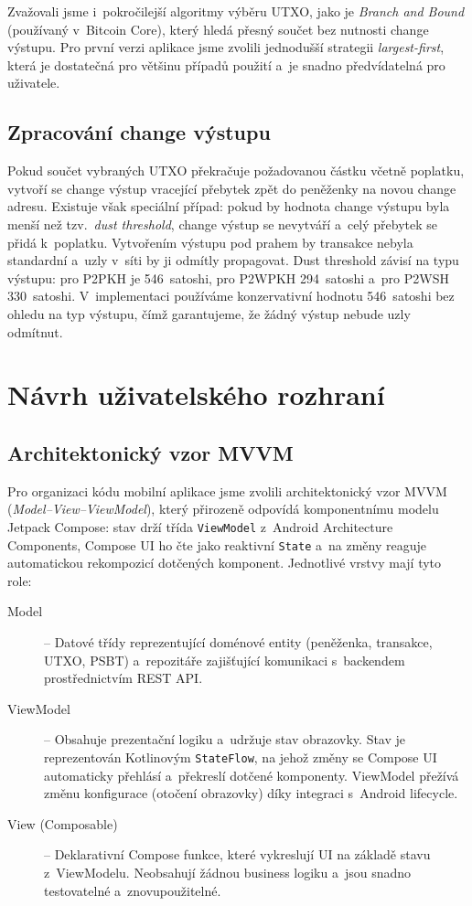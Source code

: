 Zvažovali jsme i~pokročilejší algoritmy výběru UTXO, jako je
\emph{Branch and Bound} (používaný v~Bitcoin Core), který hledá přesný součet
bez nutnosti change výstupu. Pro první verzi aplikace jsme zvolili jednodušší
strategii \emph{largest-first}, která je dostatečná pro většinu případů
použití a~je snadno předvídatelná pro uživatele.

\subsection{Zpracování change výstupu}

Pokud součet vybraných UTXO překračuje požadovanou částku včetně poplatku,
vytvoří se change výstup vracející přebytek zpět do peněženky na novou
change adresu. Existuje však speciální případ: pokud by hodnota change
výstupu byla menší než tzv.~\emph{dust threshold}, change výstup se
nevytváří a~celý přebytek se přidá k~poplatku. Vytvořením výstupu pod
prahem by transakce nebyla standardní a~uzly v~síti by ji odmítly propagovat.
Dust threshold závisí na typu výstupu: pro P2PKH je 546~satoshi,
pro P2WPKH 294~satoshi a~pro P2WSH 330~satoshi. V~implementaci
používáme konzervativní hodnotu 546~satoshi bez ohledu na typ výstupu,
čímž garantujeme, že žádný výstup nebude uzly odmítnut.

\section{Návrh uživatelského rozhraní}
\label{sec:ui-navrh}

\subsection{Architektonický vzor MVVM}

Pro organizaci kódu mobilní aplikace jsme zvolili architektonický vzor
MVVM (\emph{Model--View--ViewModel}), který přirozeně odpovídá
komponentnímu modelu Jetpack Compose: stav drží třída \texttt{ViewModel}
z~Android Architecture Components, Compose UI ho čte jako reaktivní
\texttt{State} a~na změny reaguje automatickou rekompozicí dotčených
komponent. Jednotlivé vrstvy mají tyto role:

\begin{description}
\item[Model] -- Datové třídy reprezentující doménové entity (peněženka,
  transakce, UTXO, PSBT) a~repozitáře zajišťující komunikaci s~backendem
  prostřednictvím REST API.
\item[ViewModel] -- Obsahuje prezentační logiku a~udržuje stav obrazovky.
  Stav je reprezentován Kotlinovým \texttt{StateFlow}, na jehož změny
  se Compose UI automaticky přehlásí a~překreslí dotčené komponenty.
  ViewModel přežívá změnu konfigurace (otočení obrazovky) díky integraci
  s~Android lifecycle.
\item[View (Composable)] -- Deklarativní Compose funkce, které vykreslují
  UI na základě stavu z~ViewModelu. Neobsahují žádnou business logiku
  a~jsou snadno testovatelné a~znovupoužitelné.
\end{description}

